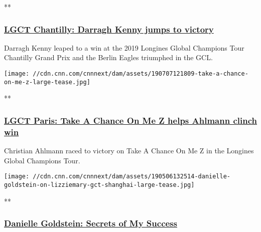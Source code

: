 **

\hypertarget{lgct-chantilly-darragh-kenny-jumps-to-victory}{%
\subsubsection{\texorpdfstring{\href{/videos/sports/2019/07/15/darragh-kenny-lgct-chantilly-review-gcl-2019-cnneq-vision-spt-intl.cnn}{LGCT
Chantilly: Darragh Kenny jumps to
victory}}{LGCT Chantilly: Darragh Kenny jumps to victory}}\label{lgct-chantilly-darragh-kenny-jumps-to-victory}}

Darragh Kenny leaped to a win at the 2019 Longines Global Champions Tour
Chantilly Grand Prix and the Berlin Eagles triumphed in the GCL.

\href{/videos/sports/2019/07/08/paris-review-longines-global-champions-tour-gcl-christian-ahlmann-cnneq-vision-spt-intl.cnn}{}

\texttt{[image: //cdn.cnn.com/cnnnext/dam/assets/190707121809-take-a-chance-on-me-z-large-tease.jpg]}

**

\hypertarget{lgct-paris-take-a-chance-on-me-z-helps-ahlmann-clinch-win}{%
\subsubsection{\texorpdfstring{\href{/videos/sports/2019/07/08/paris-review-longines-global-champions-tour-gcl-christian-ahlmann-cnneq-vision-spt-intl.cnn}{LGCT
Paris: Take A Chance On Me Z helps Ahlmann clinch
win}}{LGCT Paris: Take A Chance On Me Z helps Ahlmann clinch win}}\label{lgct-paris-take-a-chance-on-me-z-helps-ahlmann-clinch-win}}

Christian Ahlmann raced to victory on Take A Chance On Me Z in the
Longines Global Champions Tour.

\href{/videos/sports/2019/05/31/danielle-goldstein-secrets-of-my-success-global-champions-tour-cnneq-vision-lon-orig-spt-intl.cnn}{}

\texttt{[image: //cdn.cnn.com/cnnnext/dam/assets/190506132514-danielle-goldstein-on-lizziemary-gct-shanghai-large-tease.jpg]}

**

\hypertarget{danielle-goldstein-secrets-of-my-success}{%
\subsubsection{\texorpdfstring{\href{/videos/sports/2019/05/31/danielle-goldstein-secrets-of-my-success-global-champions-tour-cnneq-vision-lon-orig-spt-intl.cnn}{Danielle
Goldstein: Secrets of My
Success}}{Danielle Goldstein: Secrets of My Success}}\label{danielle-goldstein-secrets-of-my-success}}

